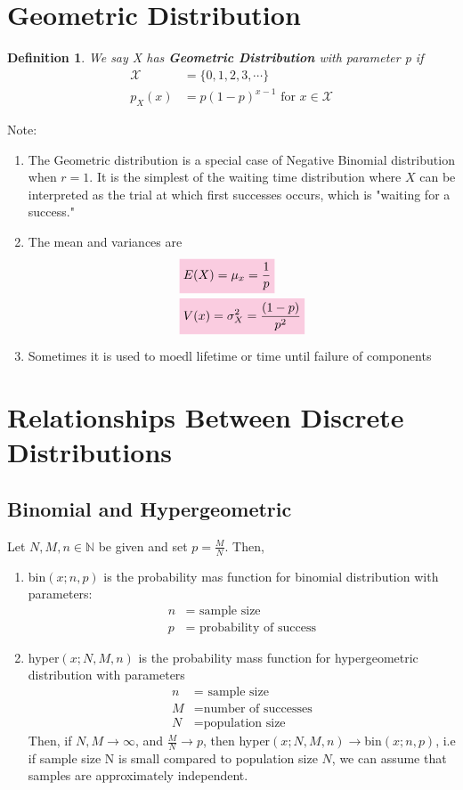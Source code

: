 \documentclass[11pt,oneside]{book}
\theoremstyle{newStyle}
\newtheorem{defn}[thm]{Definition}
\newcommand{\N}{\mathbb{N}}
\newcommand{\X}{\mathcal{X}}
\newcommand{\note}{\color{red}Note: \color{black}}
\begin{document}
\section[Geometric Distribution]{Geometric Distribution}
\begin{defn}
We say X has \textbf{Geometric Distribution} with parameter p if \begin{align*}
\X&=\{0,1,2,3,\cdots\}\\
p_X(x)&=p(1-p)^{x-1}\text{ for }x\in \X
\end{align*}
\end{defn}
\note \begin{enumerate}
\item The Geometric distribution is a special case of Negative Binomial distribution when $r=1$. It is the simplest of the waiting time distribution where $X$ can be interpreted as the trial at which first successes occurs, which is "waiting for a success."\\
\item The mean and variances are \begin{align*}
&\text{\colorbox{pink}{$E(X)=\mu_x=\frac{1}{p}$}}\\
&\text{\colorbox{pink}{$V(x)=\sigma_X^2=\frac{(1-p)}{p^2}$}}
\end{align*}
\item Sometimes it is used to moedl lifetime or time until failure of components
\end{enumerate}
\section[Relationships Between Discrete Distributions]{Relationships Between Discrete Distributions}
\subsection[Binomial and Hypergeometric]{Binomial and Hypergeometric}
Let $N,M,n\in \N$ be given and set $p=\frac{M}{N}$. Then, \begin{enumerate}[itemsep=0pt, topsep=1pt, partopsep=0pt,label=(\alph*)]
\item bin$(x;n,p)$ is the probability mas function for binomial distribution with parameters: \begin{align*}
n&=\text{ sample size}\\
p&=\text{ probability of success}
\end{align*}
\item hyper$(x;N,M,n)$ is the probability mass function for hypergeometric distribution with parameters\begin{align*}
n&=\text{ sample size}\\
M&=\text{number of successes}\\
N&=\text{population size}
\end{align*}
Then, if $N,M\to \infty$, and $\frac{M}{N}\to p$, then hyper$(x;N,M,n)\to$bin$(x;n,p)$, i.e if sample size N is small compared to population size $N$, we can assume that samples are approximately independent.
\end{enumerate}
\end{document}
